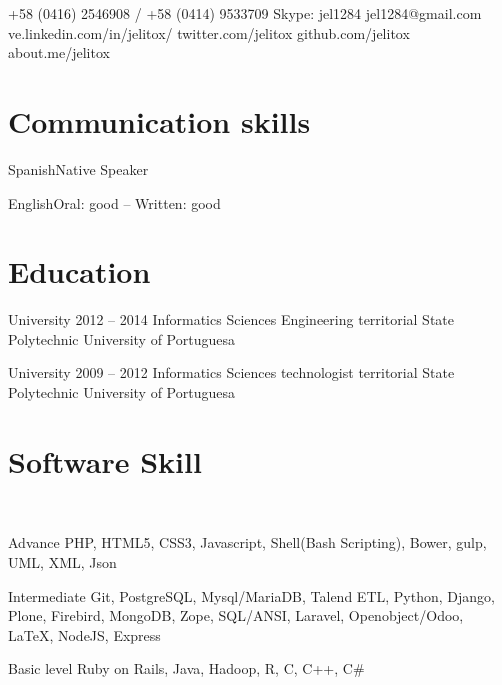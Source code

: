 \documentclass{tccv}
\begin{document}
    {+58 (0416) 2546908 / +58 (0414) 9533709}
    {Skype: jel1284}    
    {jel1284@gmail.com}
    {ve.linkedin.com/in/jelitox/}
    {twitter.com/jelitox}
    {github.com/jelitox}
    {about.me/jelitox}

\section{Communication skills}

\begin{idiomas}
\item{Spanish}{Native Speaker}
\item{English}{Oral: good -- Written: good}
\end{idiomas}
\section{Education}

\begin{estudios}

\item[University]{2012 -- 2014}
     {Informatics Sciences Engineering}
     {territorial State Polytechnic University of Portuguesa}

\item[University]{2009 -- 2012}
     {Informatics Sciences technologist}
     {territorial State Polytechnic University of Portuguesa}

\end{estudios}

\section{Software Skill}

\begin{software}
\\
\item{Advance}
     {PHP, HTML5, CSS3, Javascript, Shell(Bash Scripting), Bower, gulp, UML, XML, Json} \\
\item{Intermediate}
     {Git, PostgreSQL, Mysql/MariaDB, Talend ETL, Python, Django, Plone, Firebird, MongoDB, Zope, SQL/ANSI, Laravel, Openobject/Odoo, \LaTeX, NodeJS, Express } \\
\item{Basic level}
     {Ruby on Rails, Java, Hadoop, R, C, C++, C\#} \\

\end{software}
\end{document}
